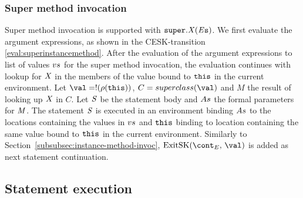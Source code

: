 \documentclass[a4paper,oneside]{article}
\begin{document}
\subsubsection{Super method invocation}
\label{subsubsec:super-method-invocation}

Super method invocation is supported with $\tt{super}.\mathit{X}(\mathit{E}{s})$.
We first evaluate the argument expressions, as shown in the CESK-transition \eqref{eval:superinstancemethod}.
After the evaluation of the argument expressions to list of values $vs$ for the super method invocation, the evaluation continues with lookup for $\mathit{X}$ in the members of the value bound to $\tt{this}$ in the current environment.
Let $\val = \deref{(\env(\this))}$, $C = \superclass{\val}$ and $M$ the result of looking up $\mathit{X}$ in $C$.
Let $\mathit{S}$ be the statement body and $As$ the formal parameters for $\mathit{M}$.
The statement $\mathit{S}$ is executed in an environment binding $As$ to the locations containing the values in $vs$ and $\tt{this}$ binding to location containing the same value bound to $\tt{this}$ in the current environment.
Similarly to Section~\ref{subsubsec:instance-method-invoc}, $\ExitSK{\val}$ is added as next statement continuation.


\subsection{Statement execution}
\label{subsec:stmt-exectution}
\end{document}
